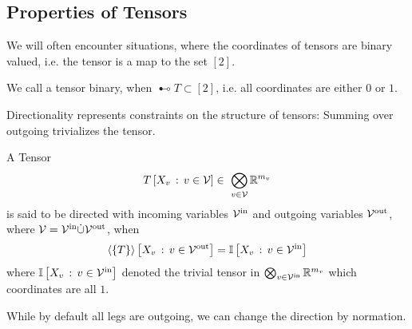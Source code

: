 \subsection{Properties of Tensors}

We will often encounter situations, where the coordinates of tensors are binary valued, i.e. the tensor is a map to the set $[2]$.

\begin{definition}\label{def:binaryTensor} %
	We call a tensor binary, when $\imageof{T}\subset[2]$, i.e. all coordinates are either $0$ or $1$.
\end{definition}

Directionality represents constraints on the structure of tensors:
Summing over outgoing trivializes the tensor.

\begin{definition}\label{def:directedTensor}
	A Tensor 
		\[ \hypercoreat{\catvariablesinset{\nodes}} \in \bigotimes_{\nodein}\rr^{\catdimof{\node}} \]
	is said to be directed with incoming variables $\mathcal{V}^{\mathrm{in}}$ and outgoing variables $\mathcal{V}^{\mathrm{out}}$, where $\mathcal{V}=\mathcal{V}^{\mathrm{in}}\dot{\cup}\mathcal{V}^{\mathrm{out}}$, when
		\[ \left\langle \{T\}\right\rangle \left[ X_{v} \, : \, v \in \mathcal{V}^{\mathrm{out}} \right] =  \mathbb{I}\left[X_{v} \, : \, v \in \mathcal{V}^{\mathrm{in}}\right] \]
	where $\mathbb{I}\left[X_{v} \, : \, v \in \mathcal{V}^{\mathrm{in}}\right]$ denoted the trivial tensor in  $\bigotimes_{v\in\mathcal{V}^{\mathrm{in}}}\mathbb{R}^{m_{v}}$ which coordinates are all $1$.
\end{definition}

While by default all legs are outgoing, we can change the direction by normation.

